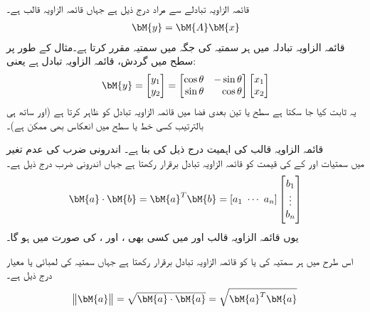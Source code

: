 قائمہ الزاویہ تبادلے سے مراد درج ذیل ہے جہاں  قائمہ الزاویہ قالب ہے۔
\begin{align}
\bM{y}=\bM{A}\bM{x}
\end{align}
 قائمہ الزاویہ تبادلہ  میں ہر سمتیہ  کی جگہ  میں سمتیہ  مقرر کرتا ہے۔مثال کے طور پر سطح میں گردش، قائمہ الزاویہ تبادل ہے یعنی:
\begin{align}\label{مساوات_آئگنی_سطحی_گردش}
\bM{y}=\begin{bmatrix} y_1\\y_2 \end{bmatrix}=\begin{bmatrix*}[r] \cos \theta&-\sin \theta\\ \sin \theta &\cos \theta \end{bmatrix*}\begin{bmatrix}x_1\\x_2  \end{bmatrix}
\end{align}
یہ ثابت کیا جا سکتا ہے سطح یا تین بعدی فضا میں قائمہ الزاویہ تبادل  کو ظاہر کرتا ہے (اور ساتھ ہی بالترتیب کسی خط یا سطح میں انعکاس بھی ممکن ہے)۔

قائمہ الزاویہ قالب کی اہمیت درج ذیل کی بنا ہے۔
\quad اندرونی ضرب کی عدم تغیر\\
 میں سمتیات  اور  کے  کی قیمت کو قائمہ الزاویہ تبادل  برقرار رکھتا ہے جہاں اندرونی ضرب درج ذیل ہے۔
\begin{align}
\bM{a}\cdot \bM{b}=\bM{a}^T\bM{b}=[a_1\,\,\cdots\,\,a_n]\begin{bmatrix}b_1\\  \vdots \\ b_n  \end{bmatrix}
\end{align}
یوں  قائمہ الزاویہ قالب  اور  میں کسی بھی  ،  اور ،  کی صورت میں  ہو گا۔

اس طرح   میں ہر سمتیہ  کی  یا  کو قائمہ الزاویہ تبادل برقرار رکھتا ہے جہاں سمتیہ کی لمبائی یا معیار درج ذیل ہے۔
\begin{align}
\norm{\bM{a}}=\sqrt{\bM{a}\cdot \bM{a}}=\sqrt{\bM{a}^T\bM{a}}
\end{align}  

